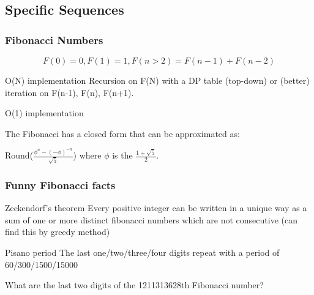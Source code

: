 \documentclass{beamer}
\begin{document}
\subsection{Specific Sequences}
\begin{frame}
  \frametitle{Fibonacci Numbers}
  \begin{equation*}
  F(0) = 0, F(1) = 1, F(n>2) = F(n-1)+F(n-2)
  \end{equation*}

  {\smaller

    \begin{block}{O(N) implementation}
      Recursion on F(N) with a DP table (top-down) or (better)
      iteration on F(n-1), F(n), F(n+1).
    \end{block}

    \begin{block}{O(1) implementation}

      The Fibonacci has a closed form that can be \alert{approximated}
      as:
      
      \bigskip

      Round($\frac{\phi^n - (-\phi)^{-n}}{\sqrt{5}}$) where $\phi$ is
      the  $\frac{1+\sqrt{5}}{2}$.
    \end{block}
  }
\end{frame}

\begin{frame}
  \frametitle{Funny Fibonacci facts}
  {\small
  \begin{block}{Zeckendorf's theorem}
    Every positive integer can be written in a unique way as a sum of
    one or more distinct fibonacci numbers which are not consecutive
    (can find this by greedy method)
  \end{block}

  \begin{block}{Pisano period} 
    The last one/two/three/four digits repeat with a period of 60/300/1500/15000

    \bigskip

    What are the last two digits of the 1211313628th Fibonacci number?
  \end{block}
  }
\end{frame}
\end{document}
